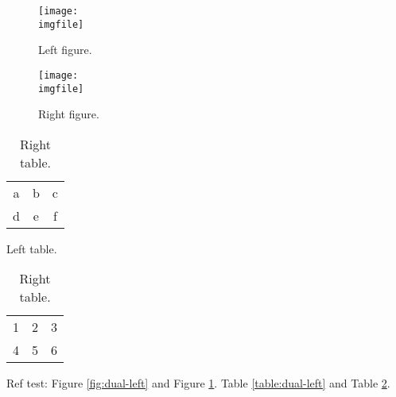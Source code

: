 \documentclass{article}
\def\imgfile{../graphics/none.png}
\begin{document}
\begin{figure}
  \centering
  \begin{minipage}{.5\textwidth}
    \centering
   \texttt{[image: \\imgfile]}
   \caption{Left figure.}
   \label{fig:dual-left}
  \end{minipage}%
  \begin{minipage}{.5\textwidth}
    \centering
   \texttt{[image: \\imgfile]}
   \caption{Right figure.}
   \label{fig:dual-right}
  \end{minipage}
  \end{figure}
\begin{table}
  \centering
  \begin{minipage}{.5\textwidth}
    \centering
   \begin{tabular}{ccc}
   a & b & c \\
   d & e & f \\
   \end{tabular}
   \caption{Left table.}
   \label{table:dual-left}
  \end{minipage}%
  \begin{minipage}{.5\textwidth}
    \centering
    \begin{tabular}{ccc}
      1 & 2 & 3 \\
      4 & 5 & 6 \\
      \end{tabular}
   \caption{Right table.}
   \label{table:dual-right}
  \end{minipage}
\end{table}

Ref test:
Figure \ref{fig:dual-left} and Figure \ref{fig:dual-right}.
Table \ref{table:dual-left} and Table \ref{table:dual-right}.
\end{document}
